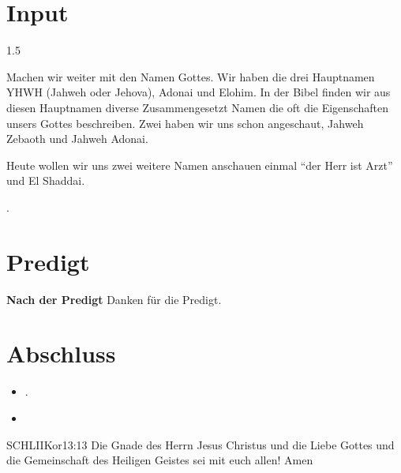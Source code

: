\documentclass[14pt]{../../inc/mybib}
\begin{document}
\section{ Input }
\begin{spacing}{1.5}
   \begin{block}[Gottesnamen]
    Machen wir weiter mit den Namen Gottes. Wir haben die drei Hauptnamen YHWH (Jahweh oder Jehova), Adonai und Elohim. In der Bibel finden wir aus diesen Hauptnamen diverse Zusammengesetzt Namen die oft die Eigenschaften unsers Gottes beschreiben. Zwei haben wir uns schon angeschaut, Jahweh Zebaoth und Jahweh Adonai.

    Heute wollen wir uns zwei weitere Namen anschauen einmal \enquote{der Herr ist Arzt} und El Shaddai.  
    \end{block}
    \begin{block}
    \end{block}
    \begin{block}[El Shaddai]
    \end{block}
    .
\end{spacing}
\section{Predigt}
\textbf{Nach der Predigt}\newline
Danken für die Predigt.
\section{Abschluss}
\begin{itemize}
    \item [] .
    \item [] 
\end{itemize}
\begin{bibelbox}{SCHL}{IIKor}{13:13}
    Die Gnade des Herrn Jesus Christus und die Liebe Gottes und die Gemeinschaft des Heiligen Geistes sei mit euch allen! Amen
\end{bibelbox}
\end{document}
